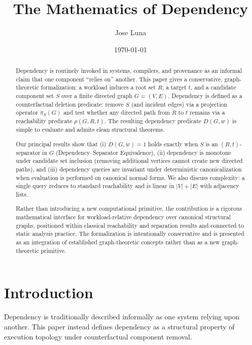 \documentclass[11pt]{article}
\title{The Mathematics of Dependency}
\author{Jose Luna}
\date{\today}
\begin{document}
\maketitle

\pagestyle{fancy}
\fancyfoot[C]{\thepage}
\renewcommand{\headrulewidth}{0.4pt}
\renewcommand{\footrulewidth}{0pt}

\begin{abstract}
Dependency is routinely invoked in systems, compilers, and provenance as an informal claim that one component ``relies on'' another. This paper gives a conservative, graph-theoretic formalization: a workload induces a root set $R$, a target $t$, and a candidate component set $S$ over a finite directed graph $G=(V,E)$. Dependency is defined as a counterfactual deletion predicate: remove $S$ (and incident edges) via a projection operator $\pi_S(G)$ and test whether any directed path from $R$ to $t$ remains via a reachability predicate $\rho(G,R,t)$. The resulting dependency predicate $D(G,w)$ is simple to evaluate and admits clean structural theorems.

Our principal results show that (i) $D(G,w)=1$ holds exactly when $S$ is an $(R,t)$-separator in $G$ (Dependency--Separator Equivalence), (ii) dependency is monotone under candidate set inclusion (removing additional vertices cannot create new directed paths), and (iii) dependency queries are invariant under deterministic canonicalization when evaluation is performed on canonical normal forms. We also discuss complexity: a single query reduces to standard reachability and is linear in $|V|+|E|$ with adjacency lists.

Rather than introducing a new computational primitive, the contribution is a rigorous mathematical interface for workload-relative dependency over canonical structural graphs, positioned within classical reachability and separation results and connected to static analysis practice. The formalization is intentionally conservative and is presented as an integration of established graph-theoretic concepts rather than as a new graph-theoretic primitive.
\end{abstract}

\section{Introduction}

Dependency is traditionally described informally as one system relying
upon another. This paper instead defines dependency as a structural
property of execution topology under counterfactual component removal.
\end{document}
